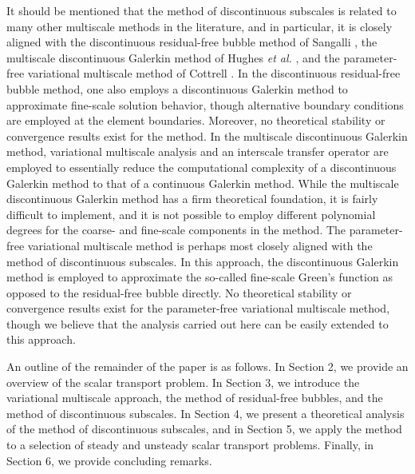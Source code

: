 \documentclass[11pt]{article}
\begin{document}
It should be mentioned that the method of discontinuous subscales is related to many other multiscale methods in the literature, and in particular, it is closely aligned with the discontinuous residual-free bubble method of Sangalli \cite{Sangalli04}, the multiscale discontinuous Galerkin method of Hughes \textit{et al.} \cite{Bochev06,Buffa06,Hughes06}, and the parameter-free variational multiscale method of Cottrell \cite{Cottrell07}.  In the discontinuous residual-free bubble method, one also employs a discontinuous Galerkin method to approximate fine-scale solution behavior, though alternative boundary conditions are employed at the element boundaries.  Moreover, no theoretical stability or convergence results exist for the method.  In the multiscale discontinuous Galerkin method, variational multiscale analysis and an interscale transfer operator are employed to essentially reduce the computational complexity of a discontinuous Galerkin method to that of a continuous Galerkin method.  While the multiscale discontinuous Galerkin method has a firm theoretical foundation, it is fairly difficult to implement, and it is not possible to employ different polynomial degrees for the coarse- and fine-scale components in the method.  The parameter-free variational multiscale method is perhaps most closely aligned with the method of discontinuous subscales.  In this approach, the discontinuous Galerkin method is employed to approximate the so-called fine-scale Green's function as opposed to the residual-free bubble directly.  No theoretical stability or convergence results exist for the parameter-free variational multiscale method, though we believe that the analysis carried out here can be easily extended to this approach.

An outline of the remainder of the paper is as follows.  In Section 2, we provide an overview of the scalar transport problem.  In Section 3, we introduce the variational multiscale approach, the method of residual-free bubbles, and the method of discontinuous subscales.  In Section 4, we present a theoretical analysis of the method of discontinuous subscales, and in Section 5, we apply the method to a selection of steady and unsteady scalar transport problems.  Finally, in Section 6, we provide concluding remarks.
\end{document}
